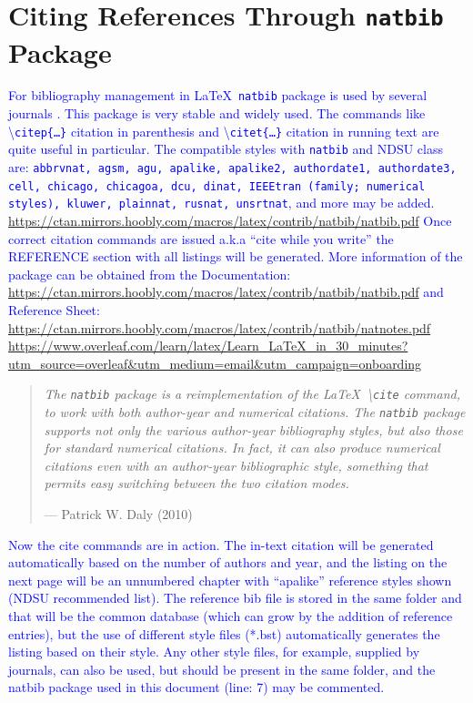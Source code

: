 \documentclass[phd]{ndsu-thesis-2022}
\newcommand\italk[1]{\textcolor{blue}{#1}}  %
\newcommand\cmd[1]{\textbackslash\texttt{#1}}  %
\begin{document}

\section{Citing References Through \texttt{natbib} Package}
\italk{For bibliography management in \LaTeX\ \texttt{natbib} package is used by several journals \citep{daly2010natural}. This package is very stable and widely used. The commands like \cmd{citep\{\ldots\}} citation in parenthesis and \cmd{citet\{\ldots\}} citation in running text are quite useful in particular. The compatible styles with \texttt{natbib} and NDSU class are:  \texttt{abbrvnat, agsm, agu, apalike, apalike2, authordate1, authordate3, cell, chicago, chicagoa, dcu, dinat, IEEEtran (family;  numerical styles), kluwer, plainnat, rusnat, unsrtnat}, and more may be added. \url{https://ctan.mirrors.hoobly.com/macros/latex/contrib/natbib/natbib.pdf} Once correct citation commands are issued a.k.a ``cite while you write'' the REFERENCE section with all listings will be generated. More information of the package can be obtained from the Documentation: \textcolor{magenta}{\url{https://ctan.mirrors.hoobly.com/macros/latex/contrib/natbib/natbib.pdf}} and Reference Sheet: \!\!\textcolor{magenta}{\url{https://ctan.mirrors.hoobly.com/macros/latex/contrib/natbib/natnotes.pdf}}
\textcolor{magenta}{\url{https://www.overleaf.com/learn/latex/Learn_LaTeX_in_30_minutes?utm_source=overleaf&utm_medium=email&utm_campaign=onboarding}}}



\begin{quote}
\singlespacing
\raggedleft
\textit{The \texttt{natbib} package is a reimplementation of the \LaTeX\ \cmd{cite} command, to work with both author-year and numerical citations. The \texttt{natbib} package supports not only the various author-year bibliography styles, but also those for standard numerical citations. In fact, it can also produce numerical citations even with an author-year bibliographic style, something that permits easy switching between the two citation modes.} 

\hfill --- Patrick W. Daly (2010)
\end{quote}

\italk{Now the cite commands are in action. The in-text citation will be generated automatically based on the number of authors and year, and the listing on the next page will be an unnumbered chapter with ``apalike'' reference styles shown (NDSU recommended list). The reference bib file is stored in the same folder and that will be the common database (which can grow by the addition of reference entries), but the use of different style files (*.bst) automatically generates the listing based on their style. Any other style files, for example, supplied by journals, can also be used, but should be present in the same folder, and the natbib package used in this document (line: 7) may be commented.}
\end{document}
